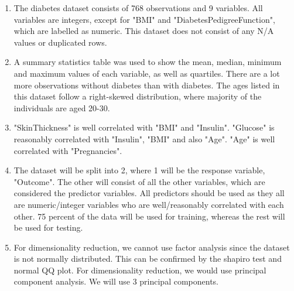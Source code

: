 \documentclass[12pt]{article}
\begin{document}
\begin{enumerate} 
	
	\item The diabetes dataset consists of 768 observations and 9 variables. All variables are integers, except for "BMI" and "DiabetesPedigreeFunction", which are labelled as numeric. This dataset does not consist of any N/A values or duplicated rows. 
	
	\item A summary statistics table was used to show the mean, median, minimum and maximum values of each variable, as well as quartiles. There are a lot more observations without diabetes than with diabetes. The ages listed in this dataset follow a right-skewed distribution, where majority of the individuals are aged 20-30. 
	
	\item "SkinThickness" is well correlated with "BMI" and "Insulin". "Glucose" is reasonably correlated with "Insulin", "BMI" and also "Age". "Age" is well correlated with "Pregnancies". 
	
	\item The dataset will be split into 2, where 1 will be the response variable, "Outcome". The other will consist of all the other variables, which are considered the predictor variables. All predictors should be used as they all are numeric/integer variables who are well/reasonably correlated with each other. 75 percent of the data will be used for training, whereas the rest will be used for testing. 
	
	\item For dimensionality reduction, we cannot use factor analysis since the dataset is not normally distributed. This can be confirmed by the shapiro test and normal QQ plot. For dimensionality reduction, we would use principal component analysis. We will use 3 principal components.\\  
	
	
	
	\begin{figure}[h!] 
		
		\centering 
		
		

\end{figure}
\end{enumerate}
\end{document}
